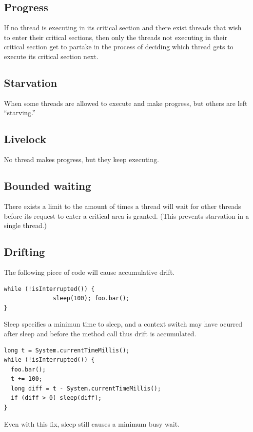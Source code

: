 \documentclass[a4paper]{article}
\begin{document}
\subsection{Progress}
If no thread is executing in its critical section and there exist threads
that wish to enter their critical sections, then only the threads not executing
in their critical section get to partake in the process of deciding which
thread gets to execute its critical section next.

\subsection{Starvation}
When some threads are allowed to execute and make progress, but others are
left ``starving.''

\subsection{Livelock}
No thread makes progress, but they keep executing.

\subsection{Bounded waiting}
There exists a limit to the amount of times a thread will wait for other
threads before its request to enter a critical area is granted. (This
prevents starvation in a single thread.)

\subsection{Drifting}
The following piece of code will cause accumulative drift.
\begin{lstlisting}[label=drift,caption=Drift example]
while (!isInterrupted()) {
              sleep(100); foo.bar();
}
\end{lstlisting}

Sleep specifies a minimun time to sleep, and a context switch may have ocurred
after sleep and before the method call thus drift is accumulated.

\begin{lstlisting}[label=drift-fix,caption=Drift fixed]
long t = System.currentTimeMillis();
while (!isInterrupted()) {
  foo.bar();
  t += 100;
  long diff = t - System.currentTimeMillis();
  if (diff > 0) sleep(diff);
}
\end{lstlisting}

Even with this fix, sleep still causes a minimum busy wait.
\end{document}
